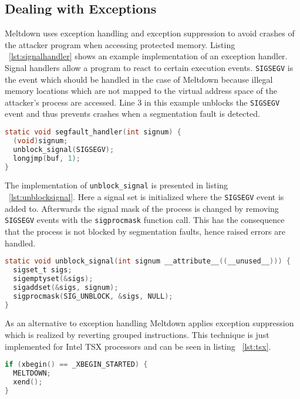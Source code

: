 \documentclass[a4paper,oneside,openright] {scrreprt}
\begin{document}
\subsection{Dealing with Exceptions}
\label{ch:intro:motivation:A}

Meltdown uses exception handling and exception suppression to avoid crashes of the attacker program when accessing protected memory.
Listing ~\ref{lst:signalhandler} shows an example implementation of an exception handler.
Signal handlers allow a program to react to certain execution events. 
\texttt{SIGSEGV} is the event which should be handled in the case of Meltdown because illegal memory locations 
which are not mapped to the virtual address space of the attacker's process are accessed.
Line 3 in this example unblocks the \texttt{SIGSEGV} event and thus prevents crashes when a segmentation fault is detected.

\begin{lstlisting}[language=C, caption=Meltdown: Exception Handling 1, label={lst:signalhandler}]
static void segfault_handler(int signum) {
  (void)signum;
  unblock_signal(SIGSEGV);
  longjmp(buf, 1);
}
\end{lstlisting}

The implementation of \texttt{unblock\_signal} is presented in listing ~\ref{lst:unblocksignal}. 
Here a signal set is initialized where the \texttt{SIGSEGV} event is added to.
Afterwards the signal mask of the process is changed by removing \texttt{SIGSEGV} events with the \texttt{sigprocmask} function call.
This has the consequence that the process is not blocked by segmentation faults, hence raised errors are handled.

\begin{lstlisting}[language=C, caption=Meltdown: Exception Handling 2, label={lst:unblocksignal}]
static void unblock_signal(int signum __attribute__((__unused__))) {
  sigset_t sigs;
  sigemptyset(&sigs);
  sigaddset(&sigs, signum);
  sigprocmask(SIG_UNBLOCK, &sigs, NULL);
}
\end{lstlisting}

As an alternative to exception handling Meltdown applies exception suppression which is realized by reverting grouped instructions.
This technique is just implemented for Intel TSX processors and can be seen in listing ~\ref{lst:tsx}.

\begin{lstlisting}[language=C, caption=Meltdown: Exception Suppression on Intel TSX, label={lst:tsx}]
if (xbegin() == _XBEGIN_STARTED) {
  MELTDOWN;
  xend();
}
\end{lstlisting}
\end{document}
